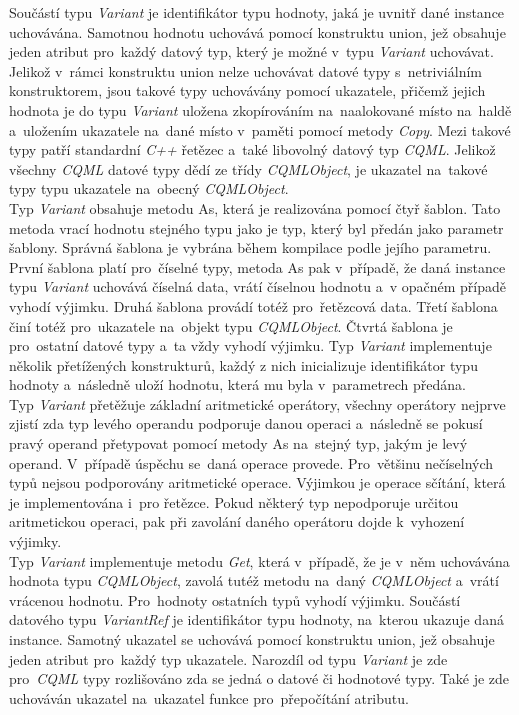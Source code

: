 \documentclass[11pt,twoside,a4paper]{book}
\begin{document}
Součástí typu \textit{Variant} je identifikátor typu hodnoty, jaká je uvnitř dané instance uchovávána. Samotnou hodnotu uchovává pomocí konstruktu union, jež obsahuje jeden atribut pro~každý datový typ, který je možné v~typu \textit{Variant} uchovávat. Jelikož v~rámci konstruktu union nelze uchovávat datové typy s~netriviálním konstruktorem, jsou takové typy uchovávány pomocí ukazatele, přičemž jejich hodnota je do typu \textit{Variant} uložena zkopírováním na~naalokované místo na~haldě a~uložením ukazatele na~dané místo v~paměti pomocí metody \textit{Copy}. Mezi takové typy patří standardní \textit{C++} řetězec a~také libovolný datový typ \textit{CQML}. Jelikož všechny \textit{CQML} datové typy dědí ze třídy \textit{CQMLObject}, je ukazatel na~takové typy typu ukazatele na~obecný \textit{CQMLObject}.\\
Typ \textit{Variant} obsahuje metodu As, která je realizována pomocí čtyř šablon. Tato metoda vrací hodnotu stejného typu jako je typ, který byl předán jako parametr šablony. Správná šablona je vybrána během kompilace podle jejího parametru. První šablona platí pro~číselné typy, metoda As pak v~případě, že daná instance typu \textit{Variant} uchovává číselná data, vrátí číselnou hodnotu a~v opačném případě vyhodí výjimku. Druhá šablona provádí totéž pro~řetězcová data. Třetí šablona činí totéž pro~ukazatele na~objekt typu \textit{CQMLObject}. Čtvrtá šablona je pro~ostatní datové typy a~ta vždy vyhodí výjimku.
Typ \textit{Variant} implementuje několik přetížených konstrukturů, každý z nich inicializuje identifikátor typu hodnoty a~následně uloží hodnotu, která mu byla v~parametrech předána.\\
Typ \textit{Variant} přetěžuje základní aritmetické operátory, všechny operátory nejprve zjistí zda typ levého operandu podporuje danou operaci a~následně se pokusí pravý operand přetypovat pomocí metody As na~stejný typ, jakým je levý operand. V~případě úspěchu se~daná operace provede. Pro~většinu nečíselných typů nejsou podporovány aritmetické operace. Výjimkou je operace sčítání, která je implementována i~pro řetězce. Pokud některý typ nepodporuje určitou aritmetickou operaci, pak při zavolání daného operátoru dojde k~vyhození výjimky.\\
Typ \textit{Variant} implementuje metodu \textit{Get}, která v~případě, že je v~něm uchovávána hodnota typu \textit{CQMLObject}, zavolá tutéž metodu na~daný \textit{CQMLObject} a~vrátí vrácenou hodnotu. Pro~hodnoty ostatních typů vyhodí výjimku.
Součástí datového typu \textit{VariantRef} je identifikátor typu hodnoty, na~kterou ukazuje daná instance. Samotný ukazatel se uchovává pomocí konstruktu union, jež obsahuje jeden atribut pro~každý typ ukazatele. Narozdíl od typu \textit{Variant} je zde pro~\textit{CQML} typy rozlišováno zda se jedná o datové či hodnotové typy. Také je zde uchováván ukazatel na~ukazatel funkce pro~přepočítání atributu.\\
\end{document}
